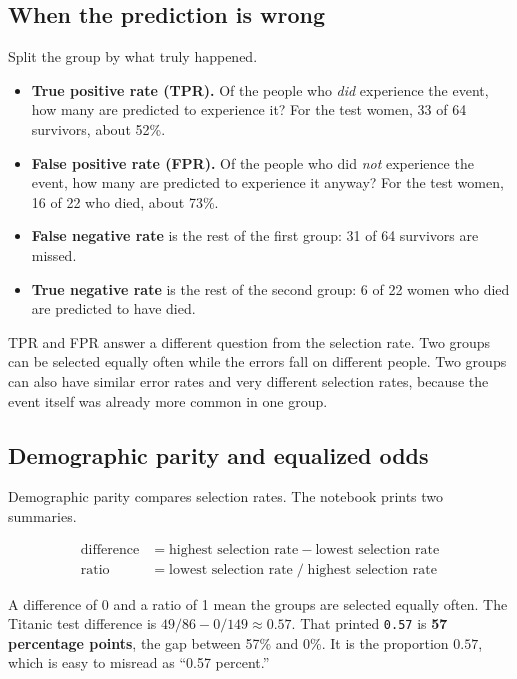\documentclass[11pt]{article}
\newcommand{\fn}[1]{\texttt{\small #1}}
\newcommand{\pct}[1]{\mbox{#1\%}}
\begin{document}
\subsection{When the prediction is wrong}

Split the group by what truly happened.

\begin{itemize}
  \item \textbf{True positive rate (TPR).} Of the people who \emph{did} experience the event, how many are predicted to experience it? For the test women, 33 of 64 survivors, about \pct{52}.
  \item \textbf{False positive rate (FPR).} Of the people who did \emph{not} experience the event, how many are predicted to experience it anyway? For the test women, 16 of 22 who died, about \pct{73}.
  \item \textbf{False negative rate} is the rest of the first group: 31 of 64 survivors are missed.
  \item \textbf{True negative rate} is the rest of the second group: 6 of 22 women who died are predicted to have died.
\end{itemize}

TPR and FPR answer a different question from the selection rate. Two groups can be selected equally often while the errors fall on different people. Two groups can also have similar error rates and very different selection rates, because the event itself was already more common in one group.

\subsection{Demographic parity and equalized odds}

Demographic parity compares selection rates. The notebook prints two summaries.

\[
\begin{aligned}
\text{difference} &= \text{highest selection rate} - \text{lowest selection rate} \\
\text{ratio} &= \text{lowest selection rate} \;/\; \text{highest selection rate}
\end{aligned}
\]

A difference of 0 and a ratio of 1 mean the groups are selected equally often. The Titanic test difference is \(49/86 - 0/149 \approx 0.57\). That printed \fn{0.57} is \textbf{57 percentage points}, the gap between \pct{57} and \pct{0}. It is the proportion \(0.57\), which is easy to misread as ``0.57 percent.''
\end{document}
